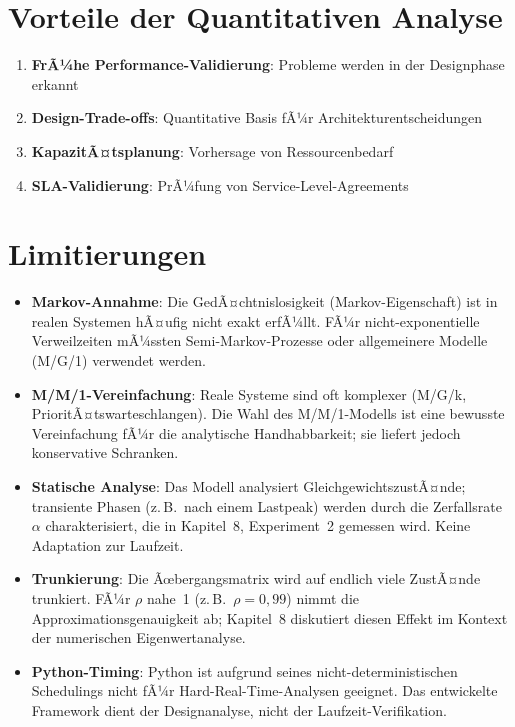 ﻿\documentclass[a4paper,12pt]{report}
\theoremstyle{definition}
\begin{document}
\section{Vorteile der Quantitativen Analyse}

\begin{enumerate}
	\item[-] \textbf{FrÃ¼he Performance-Validierung}: Probleme werden in der Designphase erkannt
	\item[-] \textbf{Design-Trade-offs}: Quantitative Basis fÃ¼r Architekturentscheidungen
	\item[-] \textbf{KapazitÃ¤tsplanung}: Vorhersage von Ressourcenbedarf
	\item[-] \textbf{SLA-Validierung}: PrÃ¼fung von Service-Level-Agreements
\end{enumerate}

\section{Limitierungen}

\begin{itemize}
	\item[-] \textbf{Markov-Annahme}: Die GedÃ¤chtnislosigkeit (Markov-Eigenschaft)
	ist in realen Systemen hÃ¤ufig nicht exakt erfÃ¼llt.  FÃ¼r
	nicht-exponentielle Verweilzeiten mÃ¼ssten Semi-Markov-Prozesse
	oder allgemeinere Modelle (M/G/1) verwendet werden.
	
	\item[-] \textbf{M/M/1-Vereinfachung}: Reale Systeme sind oft komplexer
	(M/G/k, PrioritÃ¤tswarteschlangen).  Die Wahl des M/M/1-Modells
	ist eine bewusste Vereinfachung fÃ¼r die analytische
	Handhabbarkeit; sie liefert jedoch konservative Schranken.
	
	\item[-] \textbf{Statische Analyse}: Das Modell analysiert
	GleichgewichtszustÃ¤nde; transiente Phasen (z.\,B.\ nach einem
	Lastpeak) werden durch die Zerfallsrate~$\alpha$ charakterisiert,
	die in Kapitel~8, Experiment~2 gemessen wird.  Keine Adaptation
	zur Laufzeit.
	
	\item[-] \textbf{Trunkierung}: Die Ãœbergangsmatrix wird auf endlich viele
	ZustÃ¤nde trunkiert.  FÃ¼r $\rho$ nahe~1 (z.\,B.\ $\rho = 0{,}99$)
	nimmt die Approximationsgenauigkeit ab; Kapitel~8 diskutiert
	diesen Effekt im Kontext der numerischen Eigenwertanalyse.
	
	\item[-] \textbf{Python-Timing}: Python ist aufgrund seines
	nicht-deterministischen Schedulings nicht fÃ¼r Hard-Real-Time-Analysen
	geeignet.  Das entwickelte Framework dient der Designanalyse, nicht
	der Laufzeit-Verifikation.
\end{itemize}
\end{document}
